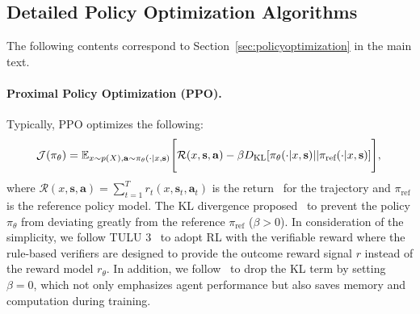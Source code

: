 \documentclass[]{youtu} %
\begin{document}
\subsection{Detailed Policy Optimization Algorithms}
\label{sec:ppogrpo}

The following contents correspond to Section~\ref{sec:policyoptimization} in the main text.


\paragraph{Proximal Policy Optimization (PPO).}
Typically,
PPO optimizes the following:
\begin{equation}
    \mathcal{J}({\pi_{\theta}})=\mathbb{E}_{x\sim p(X), \mathbf{a}\sim\pi_{\theta}(\cdot|x,\mathbf{s})}\Biggr[\mathcal{R}(x, \mathbf{s}, \mathbf{a})-\beta D_{\text{KL}}[\pi_\theta(\cdot|x,\mathbf{s})||\pi_{\text{ref}}(\cdot|x,\mathbf{s})]\Biggr],\\
\end{equation}
where $\mathcal{R}(x, \mathbf{s}, \mathbf{a})=\sum_{t=1}^{T}r_t(x, \mathbf{s}_t, \mathbf{a}_t)$ is the return~\cite{sutton1998reinforcement} for the trajectory and $\pi_{\text{ref}}$ is the reference policy model.
The KL divergence proposed~\cite{christiano2017deep} to prevent the policy $\pi_{\theta}$ from deviating greatly from the reference $\pi_{\text{ref}}$ ($\beta>0$).
In consideration of the simplicity, we follow TULU 3~\cite{lambert2024tulu} to adopt RL with the verifiable reward where the rule-based verifiers are designed to provide the outcome reward signal $r$ instead of the reward model $r_\theta$.
In addition, we follow~\cite{liu2025understanding} to drop the KL term by setting $\beta=0$, which not only emphasizes agent performance but also saves memory and computation during training.
\end{document}
